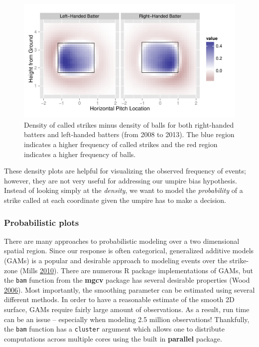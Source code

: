 \documentclass[12pt,]{isuthesis}
\begin{document}
\begin{figure}[htbp]
\centering
\includegraphics{images/strikesVSballs.pdf}
\caption{\label{fig:strikesVSballs}Density of called strikes minus density
of balls for both right-handed batters and left-handed batters (from
2008 to 2013). The blue region indicates a higher frequency of called
strikes and the red region indicates a higher frequency of balls.}
\end{figure}

These density plots are helpful for visualizing the observed frequency
of events; however, they are not very useful for addressing our umpire
bias hypothesis. Instead of looking simply at the \emph{density}, we
want to model the \emph{probability} of a strike called at each
coordinate given the umpire has to make a decision.

\subsubsection{Probabilistic plots}

There are many approaches to probabilistic modeling over a two
dimensional spatial region. Since our response is often categorical,
generalized additive models (GAMs) is a popular and desirable approach
to modeling events over the strike-zone (Mills
\protect\hyperlink{ref-loess}{2010}). There are numerous R package
implementations of GAMs, but the \texttt{bam} function from the
\textbf{mgcv} package has several desirable properties (Wood
\protect\hyperlink{ref-mgcv}{2006}). Most importantly, the smoothing
parameter can be estimated using several different methods. In order to
have a reasonable estimate of the smooth 2D surface, GAMs require fairly
large amount of observations. As a result, run time can be an issue --
especially when modeling 2.5 million observations! Thankfully, the
\texttt{bam} function has a \texttt{cluster} argument which allows one
to distribute computations across multiple cores using the built in
\textbf{parallel} package.
\end{document}
